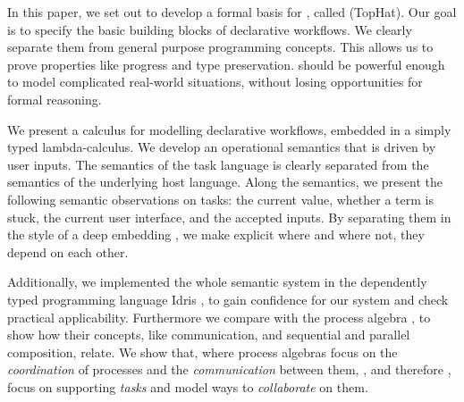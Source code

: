 



In this paper, we set out to develop a formal basis for \TOP, called \TOPHAT (TopHat).
Our goal is to specify the basic building blocks of declarative workflows.
We clearly separate them from general purpose programming concepts.
This allows us to prove properties like progress and type preservation.
\TOPHAT should be powerful enough to model complicated real-world situations,
without losing opportunities for formal reasoning.


We present a calculus for modelling declarative workflows, embedded in a simply typed lambda-calculus.
We develop an operational semantics that is driven by user inputs.
The semantics of the task language is clearly separated from the semantics of the underlying host language.
Along the semantics, we present the following semantic observations on tasks: the current value, whether a term is stuck, the current user interface, and the accepted inputs.
By separating them in the style of a deep embedding \cite{conf/cefp/Gibbons13}, we make explicit where and where not, they depend on each other.

Additionally, we implemented the whole semantic system in the dependently typed programming language Idris \cite{journals/jfp/Brady13},
to gain confidence for our system and check practical applicability.
Furthermore we compare \TOPHAT  with the process algebra \CSP, to show how their concepts, like communication, and sequential and parallel composition, relate.
We show that, where process algebras focus on the \emph{coordination} of processes and the \emph{communication} between them,
\TOP, and therefore \TOPHAT, focus on supporting \emph{tasks} and model ways to \emph{collaborate} on them.
